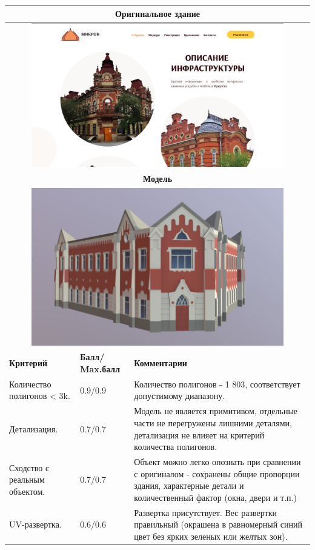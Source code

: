 \begin{longtable}{|p{4cm}|p{2.5cm}|p{7.5cm}|}
    \hline
    \multicolumn{3}{|c|}{\textbf{Оригинальное здание} } \\
    \hline
    \multicolumn{3}{|c|}{\includegraphics[width=11cm]{2}} \\
    \hline
    \multicolumn{3}{|c|}{\textbf{Модель}} \\
    \hline
    \multicolumn{3}{|c|}{\includegraphics[width=11cm]{src/model_3}} \\
    \hline
    \textbf{Критерий} & \textbf{Балл/ Max.балл} & \textbf{Комментарии} \\
    \hline
    Количество полигонов < 3k. & 0.9/0.9 & Количество полигонов - 1 803, соответствует допустимому диапазону. \\
    \hline
    Детализация. & 0.7/0.7 & Модель не является примитивом, отдельные части не перегружены лишними деталями, детализация не влияет на критерий количества полигонов. \\
    \hline
    Сходство с реальным объектом. & 0.7/0.7 & Объект можно легко опознать при сравнении с оригиналом - сохранены общие пропорции здания, характерные детали и количественный фактор (окна, двери и т.п.) \\
    \hline
    UV-развертка. & 0.6/0.6 & Развертка присутствует. Вес развертки правильный (окрашена в равномерный синий цвет без ярких зеленых или желтых зон). 

\end{longtable}
